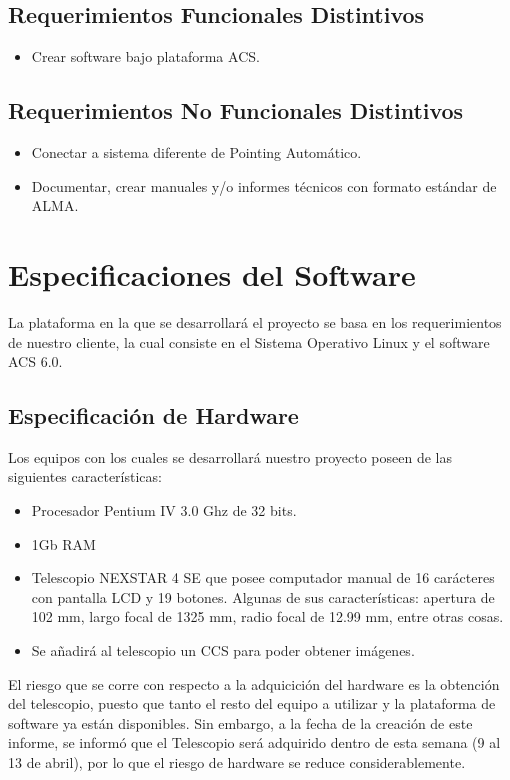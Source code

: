 \documentclass[letterpaper,spanish,10pt]{article}
\begin{document}
\subsection{Requerimientos Funcionales Distintivos}
\begin{itemize}
	\item Crear software bajo plataforma ACS.
\end{itemize}

\subsection{Requerimientos No Funcionales Distintivos}
\begin{itemize}
	\item Conectar a sistema diferente de Pointing Autom\'atico.
	\item Documentar, crear manuales y/o informes t\'ecnicos con formato est\'andar de ALMA.
\end{itemize}


\newpage


\section{Especificaciones del Software}
La plataforma en la que se desarrollar\'a el proyecto se basa en los requerimientos de nuestro cliente, la cual consiste en el Sistema Operativo Linux y el software ACS 6.0.

\subsection{Especificaci\'on de Hardware}
Los equipos con los cuales se desarrollar\'a nuestro proyecto poseen de las siguientes caracter\'isticas:

\begin{itemize}
	\item Procesador Pentium IV 3.0 Ghz de 32 bits.
	\item 1Gb RAM
	\item Telescopio NEXSTAR 4 SE que posee computador manual de 16 car\'acteres con pantalla LCD y 19 botones. Algunas de sus caracter\'isticas: apertura de 102 mm, largo focal de 1325 mm, radio focal de 12.99 mm, entre otras cosas.
	\item Se a\~nadir\'a al telescopio un CCS para poder obtener im\'agenes.
\end{itemize}

El riesgo que se corre con respecto a la adquicici\'on del hardware es la obtenci\'on del telescopio, puesto que tanto el resto del equipo a utilizar y la plataforma de software ya est\'an disponibles.
Sin embargo, a la fecha de la creaci\'on de este informe, se inform\'o que el Telescopio ser\'a adquirido dentro de esta semana (9 al 13 de abril), por lo que el riesgo de hardware se reduce considerablemente.
\end{document}
